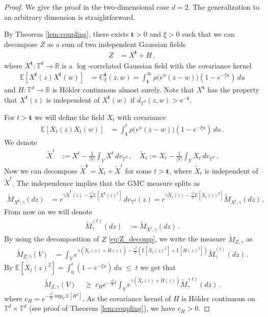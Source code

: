 \documentclass[11pt]{article}
\numberwithin{equation}{section}
\theoremstyle{definition}
\renewcommand{\tilde}{\widetilde}          %
\renewcommand{\leq}{\;\leqslant\;}                   %
\renewcommand{\geq}{\;\geqslant\;}                   %
\newcommand{\R}{\mathbb{R}}
\newcommand{\E}{\mathbb{E}}
\def\T{\mathbb{T}}
\newcommand{\grea}{>}
\begin{document}
\begin{proof}
We give the proof in the two-dimensional case $d=2$. The generalization to an arbitrary dimension is straightforward.

By Theorem \eqref{lem:coupling}, there exists $\mathbf{t} > 0$ and $\xi > 0$ such that we can decompose $Z$ as a sum of two independent Gaussian fields
\begin{align}\label{eq:Z_decomp}
Z &= X^{\mathbf{t}} + H\,,
\end{align}
where $X^{\mathbf{t}}: \T^d \to \R$ is a $\log$-correlated Gaussian field with the covariance kernel
\begin{align*}
\E[X^{\mathbf{t}}(z) X^{\mathbf{t}}(w)] &= C^\mathbf{t}_\xi(z,w) =  \int_\mathbf{t}^\infty \rho \big( e^u (z-w) \big) (1-e^{-\xi u}) \, du
\end{align*}
and $H: \T^d \to \R$ is Hölder continuous almost surely. Note that $X^{\mathbf{t}}$ has the property that $X^{\mathbf{t}}(z)$ is independent of $X^{\mathbf{t}}(w)$ if $d_{\T^d}(z,w) \grea e^{-\mathbf{t}}$.

For $t > \mathbf{t}$ we will define the field $X_t$  with covariance
\begin{align*}
\E[X_t(z) X_t(w)] & = \int_\mathbf{t}^t \rho \big( e^u (z-w) \big) (1-e^{-\xi u}) \, du \,.
\end{align*}
We denote 
\begin{align*}
\tilde X^t &:= X^t -  \frac{1}{|V|} \int_V X^t \, dv_{\T^d} \,, \quad \tilde X_t := X_t - \frac{1}{|V|} \int_V X_t \, dv_{\T^d}\,.
\end{align*}
Now we can decompose $\tilde X^{\mathbf{t}} = \tilde X_{t} + \tilde X^{t}$ for some $t > \mathbf{t}$, where $\tilde X_t$ is independent of $\tilde X^t$. The independence implies that the GMC measure splits as 
\begin{align*}
\tilde M_{X^{\mathbf{t}},\gamma}(dz) &= e^{\gamma \tilde X^{\mathbf{t}}(z) - \frac{\gamma^2}{2}\E [X^{\mathbf{t}}(z)^2] } \, dv_{\T^d}(z)  = e^{\gamma \tilde X_t(z) - \frac{\gamma^2}{2} \E[X_t(z)^2]} \tilde M_{X^t,\gamma} (dz)\,.
\end{align*}
From now on we will denote 
\begin{align*}
\tilde M^{(t)}_\gamma(dz) &:= \tilde M_{X^t, \gamma}(dz)\,.
\end{align*}
By using the decomposition of $Z$ \eqref{eq:Z_decomp}, we write the measure $\tilde M_{Z,\gamma}$ as
\begin{align*}
\tilde M_{Z,\gamma}(V) &= \int_V e^{\gamma( \tilde X_{t}(z)+ \tilde H(z)) - \frac{\gamma^2}{2} (\E[ X_{t}(z)^2] + \E [H(z)^2]) }  \tilde M_\gamma^{(t)}(dz)\,.
\end{align*}
By  $\E[X_t(z)^2] = \int_0^t (1-e^{-\xi u}) \, du \leq t$ we get that
\begin{align}\label{eq:c_H_bound}
\tilde M_{Z,\gamma}(V)  &\geq c_H  e^{- \frac{\gamma^2}{2} t} \int_V e^{\gamma (\tilde X_{t}(z) + \tilde H(z))}  \tilde M^{(t)}_\gamma(dz) \,.
\end{align} 
where $c_H = e^{- \frac{\gamma^2}{2} \sup_{V} \E [H^2]}$. As the covariance kernel of $H$ is Hölder continuous on $\T^d \times \T^d$ (see proof of Theorem \ref{lem:coupling}), we have $c_H > 0$.


\end{proof}
\end{document}
